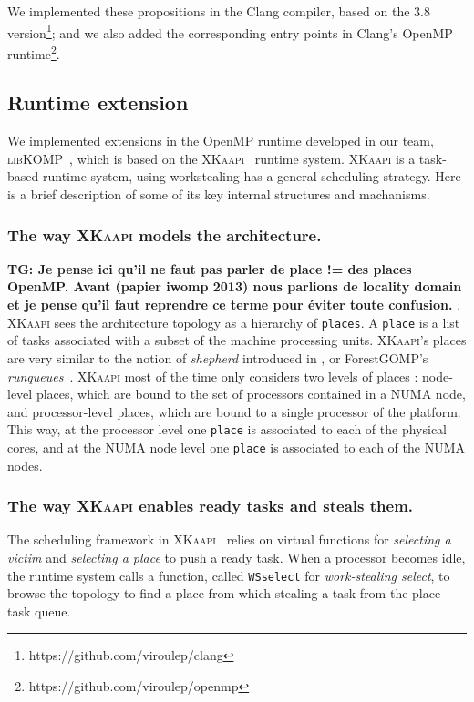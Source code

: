\documentclass{Styles/llncs}
\newcommand{\kaapi}{\textsc{\mbox{XKaapi}}\xspace}
\newcommand{\libXKOMP}{\textsc{libKOMP}\xspace}
\newcommand{\TG}[1]{{\color{red}\bfseries TG: #1}}
\begin{document}
We implemented these propositions in the Clang compiler, based on the 3.8 version\footnote{https://github.com/viroulep/clang}; and we also added the corresponding entry points in Clang's OpenMP runtime\footnote{https://github.com/viroulep/openmp}.


\subsection{Runtime extension}

We implemented extensions in the OpenMP runtime developed in our team, \libXKOMP~\cite{Durand2013,libkomp},
which is based on the \kaapi~\cite{Bleuse2014,parco2015} runtime system.
\kaapi is a task-based runtime system, using workstealing has a general scheduling strategy.
Here is a brief description of some of its key internal structures and machanisms.

\subsubsection{The way \kaapi models the architecture.}
\TG{Je pense ici qu'il ne faut pas parler de place != des places OpenMP. Avant (papier iwomp 2013) nous parlions de locality domain et je pense qu'il faut reprendre ce terme pour éviter toute confusion. }.
\kaapi sees the architecture topology as a hierarchy of \verb/places/.
A \verb/place/ is a list of tasks associated with a subset of the machine processing units.
\kaapi's places are very similar to the notion of \emph{shepherd} introduced in \cite{DBLP:journals/ijhpca/OlivierPWSP12}, or ForestGOMP's \emph{runqueues}~\cite{BroFurGogWacNam10IJPP}.
\kaapi most of the time only considers two levels of places : node-level places,
which are bound to the set of processors contained in a NUMA node, and processor-level places, which are bound to a single processor of the platform.
This way, at the processor level one \verb/place/ is associated to each of the physical cores, and
at the NUMA node level one \verb/place/ is associated to each of the NUMA nodes.


\subsubsection{The way \kaapi enables ready tasks and steals them.}

The scheduling framework in \kaapi~\cite{Bleuse2014,parco2015} relies on virtual functions
for \textit{selecting a victim} and \textit{selecting a place} to push a ready task.
When a processor becomes idle, the runtime system calls a function, called  \verb/WSselect/ for \emph{work-stealing select}, to browse the topology to find a place from which stealing a task from the place task queue.
\end{document}
